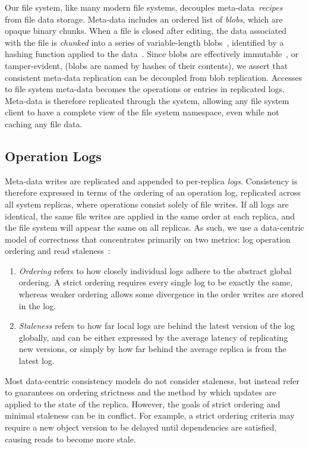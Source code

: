 \documentclass[10pt,conference,letterpaper]{IEEEtran}
\begin{document}
Our file system, like many modern file systems,
decouples
meta-data~\emph{recipes}~\cite{tolia:opportunistic,gfs,shvachko2010hadoop,ross2000pvfs,globalfs}
from file
data storage.
Meta-data includes an ordered list of \emph{blobs}, which are opaque binary chunks.
When a file is closed after editing, the data associated with the file is \emph{chunked} into a
series of variable-length blobs~\cite{lbfs}, identified by a hashing function applied to
the data~\cite{rabin}.
Since blobs are effectively immutable~\cite{helland_immutability_2015}, or tamper-evident, (blobs are named by hashes of
their contents), we assert that consistent meta-data replication can be decoupled from blob
replication.
Accesses to file system meta-data becomes the operations or entries in replicated logs.
Meta-data is therefore replicated through the system, allowing any file
system client to have a complete view of the file system namespace, even while
not caching any file data.

\subsection{Operation Logs}

Meta-data writes are replicated and appended to per-replica \emph{logs}.
Consistency is therefore expressed in terms of the ordering of an operation log,
replicated across all system replicas, where operations consist solely of file
writes.
If all logs are identical, the same file writes are applied in the same order
at each replica, and the file system will appear the same on all replicas.
As such,
we use a {data-centric} model of correctness that concentrates primarily on
two metrics: log operation ordering and read
staleness~\cite{bermbach_consistency_2013}:
\begin{enumerate}
\item \emph{Ordering} refers to how closely individual logs adhere to the abstract
  global ordering. A strict ordering requires every single log to be exactly the
  same, whereas weaker ordering allows some divergence in the order writes are stored in
  the log.
\item \emph{Staleness} refers to how far local logs are behind the latest version of the log globally,
  and can be either expressed by the average latency of replicating new versions, or
  simply by how far behind the average replica is from the latest log.
\end{enumerate}

Most data-centric consistency models do not consider staleness, but instead refer to
guarantees on ordering strictness and the method by which updates are applied to the state
of the replica.
However, the goals of strict ordering and minimal staleness can be in conflict. For
example, a strict ordering criteria may require a new object version to be delayed until
dependencies are satisfied, causing reads to become more stale.
\end{document}
